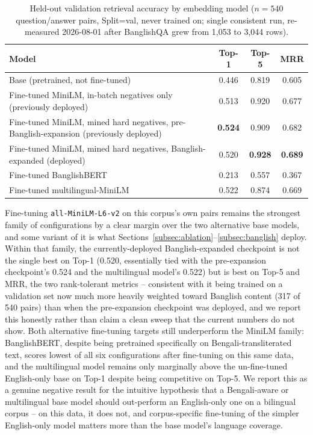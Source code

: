 \documentclass[a4paper,twoside]{article}
\begin{document}
\begin{table}[t]
\caption{Held-out validation retrieval accuracy by embedding model ($n=540$ question/answer pairs, Split=val, never trained on; single consistent run, re-measured 2026-08-01 after BanglishQA grew from 1,053 to 3,044 rows).}\label{tab:embedding-eval} \centering
\begin{tabular}{|l|c|c|c|}
\hline
Model & Top-1 & Top-5 & MRR \\
\hline
Base (pretrained, not fine-tuned) & 0.446 & 0.819 & 0.605 \\
Fine-tuned MiniLM, in-batch negatives only (previously deployed) & 0.513 & 0.920 & 0.677 \\
Fine-tuned MiniLM, mined hard negatives, pre-Banglish-expansion (previously deployed) & \textbf{0.524} & 0.909 & 0.682 \\
Fine-tuned MiniLM, mined hard negatives, Banglish-expanded (deployed) & 0.520 & \textbf{0.928} & \textbf{0.689} \\
Fine-tuned BanglishBERT & 0.213 & 0.557 & 0.367 \\
Fine-tuned multilingual-MiniLM & 0.522 & 0.874 & 0.669 \\
\hline
\end{tabular}
\end{table}

Fine-tuning \texttt{all-MiniLM-L6-v2} on this corpus's own pairs remains the strongest family of configurations by a clear margin over the two alternative base models, and some variant of it is what Sections~\ref{subsec:ablation}--\ref{subsec:banglish} deploy. Within that family, the currently-deployed Banglish-expanded checkpoint is not the single best on Top-1 (0.520, essentially tied with the pre-expansion checkpoint's 0.524 and the multilingual model's 0.522) but is best on Top-5 and MRR, the two rank-tolerant metrics -- consistent with it being trained on a validation set now much more heavily weighted toward Banglish content (317 of 540 pairs) than when the pre-expansion checkpoint was deployed, and we report this honestly rather than claim a clean sweep that the current numbers do not show. Both alternative fine-tuning targets still underperform the MiniLM family: BanglishBERT, despite being pretrained specifically on Bengali-transliterated text, scores lowest of all six configurations after fine-tuning on this same data, and the multilingual model remains only marginally above the un-fine-tuned English-only base on Top-1 despite being competitive on Top-5. We report this as a genuine negative result for the intuitive hypothesis that a Bengali-aware or multilingual base model should out-perform an English-only one on a bilingual corpus -- on this data, it does not, and corpus-specific fine-tuning of the simpler English-only model matters more than the base model's language coverage.
\end{document}

